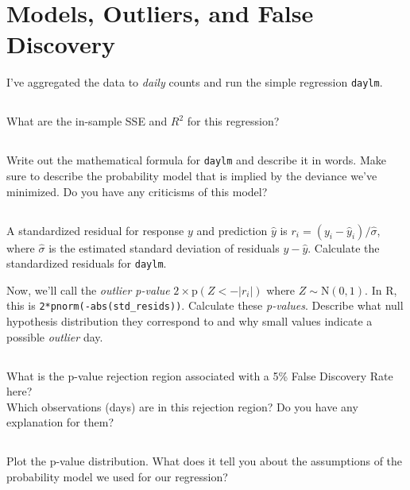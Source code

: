\documentclass[12pt]{article}
\newcommand{\mr}[1]{\mathrm{#1}}
\begin{document}

\newpage
\section{Models, Outliers, and False Discovery}

\bigskip
I've aggregated the data to {\it daily} counts and run the simple regression \texttt{daylm}.

\subsection{}
What are the in-sample SSE and $R^2$ for this regression?

\subsection{}
Write out the mathematical formula for \texttt{daylm} and describe it in words.  Make sure to describe the probability model that is implied by the deviance we've minimized.  Do you have any criticisms of this model?

\subsection{} 
A standardized residual for response $y$ and prediction $\hat y$ is $r_i= (y_i-\hat y_i)/\hat\sigma$, where $\hat\sigma$ is the estimated standard deviation of residuals $y-\hat y$.  Calculate the standardized residuals for \texttt{daylm}.

\medskip \noindent
Now, we'll call the {\it outlier p-value} $2\times \mr{p}(Z < -|r_i|)$ where $Z \sim \mr{N}(0,1)$.  In R, this is \verb!2*pnorm(-abs(std_resids))!. 
Calculate these {\it p-values}.  Describe what null hypothesis distribution they correspond to and why small values indicate a possible {\it outlier} day.

\subsection{} What is the p-value rejection region associated with a 5\% False Discovery Rate here?  \\Which observations (days) are in this rejection region?  Do you have any explanation for them?

\subsection{} Plot the p-value distribution.  What does it tell you about the
assumptions of the probability model we used for our regression?
\end{document}
